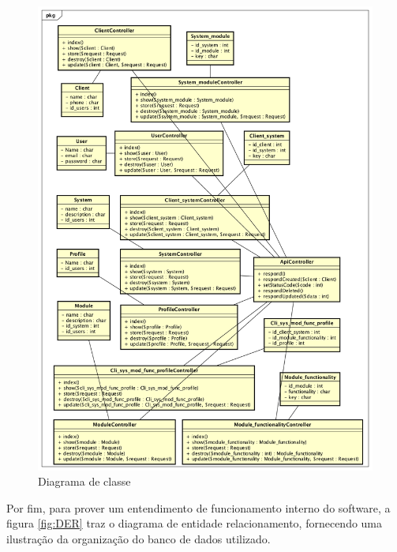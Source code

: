 \begin{figure}
	\includegraphics[width=1\textwidth]{images/Diagrama_de_classe}
	\caption{Diagrama de classe}
    \label{fig:Diagrama de classe}
\end{figure}


Por fim, para prover um entendimento de funcionamento interno do software, a figura \ref{fig:DER} traz o diagrama de entidade relacionamento, fornecendo uma ilustração da organização do banco de dados utilizado.


